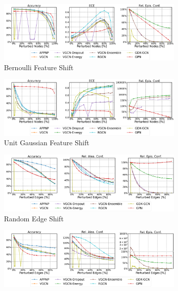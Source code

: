 \begin{figure}
    \centering
    \begin{subfigure}{\textwidth}
        \includegraphics[width=\textwidth]{sections/009_neurips2021/resources/plots/CoauthorCS-bernoulli-shift.pdf}
        \caption{Bernoulli Feature Shift}
    \end{subfigure}
    \begin{subfigure}{\textwidth}
        \includegraphics[width=\textwidth]{sections/009_neurips2021/resources/plots/CoauthorCS-normal-shift.pdf}
        \caption{Unit Gaussian Feature Shift}
    \end{subfigure}
    \begin{subfigure}{\textwidth}
        \includegraphics[width=\textwidth]{sections/009_neurips2021/resources/plots/CoauthorCS-random-shift.pdf}
        \caption{Random Edge Shift}
    \end{subfigure}
    \begin{subfigure}{\textwidth}
        \includegraphics[width=\textwidth]{sections/009_neurips2021/resources/plots/CoauthorCS-dice-shift.pdf}

\end{subfigure}
\end{figure}
